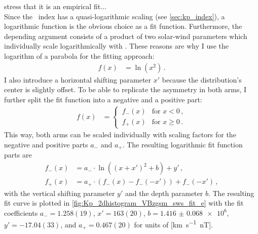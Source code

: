 
stress that it is an empirical fit...\\

Since the \Kp~index has a quasi-logarithmic scaling (see \autoref{sec:kp_index}), a logarithmic function is the obvious choice as a fit function. Furthermore, the depending argument consists of a product of two solar-wind parameters which individually scale logarithmically with \Kp{}. These reasons are why I use the logarithm of a parabola for the fitting approach:
\begin{align}
	f(x) &= \ln\left(x^2\right)	\,.	\label{eq:log_square_function}
\end{align}
I also introduce a horizontal shifting parameter $x'$ because the distribution's center is slightly offset. To be able to replicate the asymmetry in both arms, I further split the fit function into a negative and a positive part:
\begin{align}
	f(x) &=
	\begin{cases}
		\,f_-(x) &\text{for } x < 0	\,,\\
		\,f_+(x) &\text{for } x \ge 0	\,.
	\end{cases}	\label{eq:log_square_fit_function}
\end{align}
This way, both arms can be scaled individually with scaling factors for the negative and positive parts $a_-$ and $a_+$. The resulting logarithmic fit function parts are
\begin{align}
	f_-(x) &= a_- \cdot \ln\left(\left(x + x'\right)^2 + b\right) + y'	\,,\\
	f_+(x) &= a_+ \cdot \left(f_-(x) - f_-\left(-x'\right)\right) + f_-\left(-x'\right)	\,,
\end{align}
with the vertical shifting parameter $y'$ and the depth parameter $b$. The resulting fit curve is plotted in \autoref{fig:Kp_2dhistogram_VBzgsm_sws_fit_e} with the fit coefficients $a_- = 1.258(19)$, $x' = 163(20)$, $b = \num{1.416(68)e6}$, $y' = -17.04(33)$, and $a_+ = 0.467(20)$ for units of [\si{\km\per\s \nano\tesla}].
